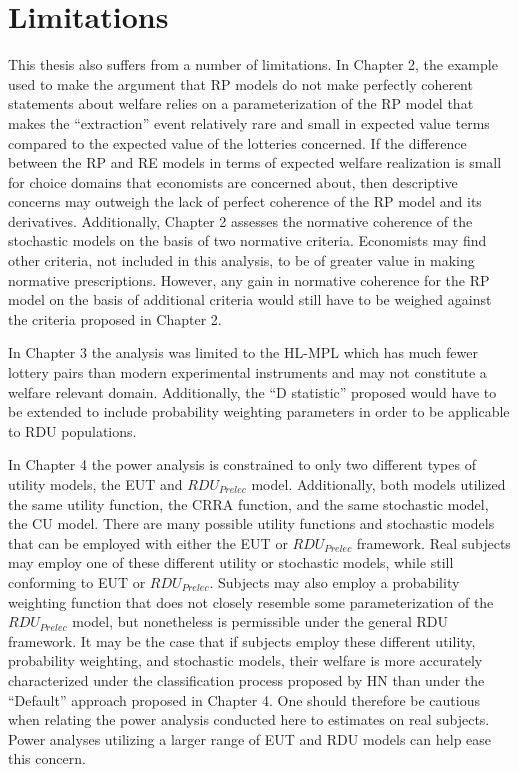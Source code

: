 \documentclass[../main.tex]{subfiles}
\begin{document}
\section{Limitations}
This thesis also suffers from a number of limitations.
In Chapter 2, the example used to make the argument that RP models do not make perfectly coherent statements about welfare relies on a parameterization of the RP model that makes the \enquote{extraction} event relatively rare and small in expected value terms compared to the expected value of the lotteries concerned.
If the difference between the RP and RE models in terms of expected welfare realization is small for choice domains that economists are concerned about, then descriptive concerns may outweigh the lack of perfect coherence of the RP model and its derivatives.
Additionally, Chapter 2 assesses the normative coherence of the stochastic models on the basis of two normative criteria.
Economists may find other criteria, not included in this analysis, to be of greater value in making normative prescriptions.
However, any gain in normative coherence for the RP model on the basis of additional criteria would still have to be weighed against the criteria proposed in Chapter 2.

In Chapter 3 the analysis was limited to the HL-MPL which has much fewer lottery pairs than modern experimental instruments and may not constitute a welfare relevant domain.
Additionally, the \enquote{D statistic} proposed would have to be extended to include probability weighting parameters in order to be applicable to RDU populations.

In Chapter 4 the power analysis is constrained to only two different types of utility models, the EUT and $\mathit{RDU_{Prelec}}$ model.
Additionally, both models utilized the same utility function, the CRRA function, and the same stochastic model, the CU model.
There are many possible utility functions and stochastic models that can be employed with either the EUT or $\mathit{RDU_{Prelec}}$ framework.
Real subjects may employ one of these different utility or stochastic models, while still conforming to EUT or $\mathit{RDU_{Prelec}}$.
Subjects may also employ a probability weighting function that does not closely resemble some parameterization of the $\mathit{RDU_{Prelec}}$ model, but nonetheless is permissible under the general RDU framework.
It may be the case that if subjects employ these different utility, probability weighting, and stochastic models, their welfare is more accurately characterized under the classification process proposed by HN than under the \enquote{Default} approach proposed in Chapter 4.
One should therefore be cautious when relating the power analysis conducted here to estimates on real subjects. %
Power analyses utilizing a larger range of EUT and RDU models can help ease this concern.
\end{document}
